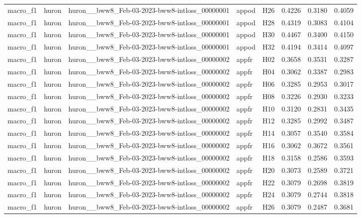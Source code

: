\begin{table}[tbp]
\begin{tabular}{lllllrrr}
macro\_f1 & huron & huron\_\_bww8\_Feb-03-2023-bww8-intloss\_00000001 & appod & H26 & 0.4226 & 0.3180 & 0.4059 \\
macro\_f1 & huron & huron\_\_bww8\_Feb-03-2023-bww8-intloss\_00000001 & appod & H28 & 0.4319 & 0.3083 & 0.4104 \\
macro\_f1 & huron & huron\_\_bww8\_Feb-03-2023-bww8-intloss\_00000001 & appod & H30 & 0.4467 & 0.3400 & 0.4150 \\
macro\_f1 & huron & huron\_\_bww8\_Feb-03-2023-bww8-intloss\_00000001 & appod & H32 & 0.4194 & 0.3414 & 0.4097 \\
macro\_f1 & huron & huron\_\_bww8\_Feb-03-2023-bww8-intloss\_00000002 & appfr & H02 & 0.3658 & 0.3531 & 0.3287 \\
macro\_f1 & huron & huron\_\_bww8\_Feb-03-2023-bww8-intloss\_00000002 & appfr & H04 & 0.3062 & 0.3387 & 0.2983 \\
macro\_f1 & huron & huron\_\_bww8\_Feb-03-2023-bww8-intloss\_00000002 & appfr & H06 & 0.3285 & 0.2953 & 0.3017 \\
macro\_f1 & huron & huron\_\_bww8\_Feb-03-2023-bww8-intloss\_00000002 & appfr & H08 & 0.3226 & 0.2930 & 0.3233 \\
macro\_f1 & huron & huron\_\_bww8\_Feb-03-2023-bww8-intloss\_00000002 & appfr & H10 & 0.3120 & 0.2831 & 0.3435 \\
macro\_f1 & huron & huron\_\_bww8\_Feb-03-2023-bww8-intloss\_00000002 & appfr & H12 & 0.3285 & 0.2992 & 0.3487 \\
macro\_f1 & huron & huron\_\_bww8\_Feb-03-2023-bww8-intloss\_00000002 & appfr & H14 & 0.3057 & 0.3540 & 0.3584 \\
macro\_f1 & huron & huron\_\_bww8\_Feb-03-2023-bww8-intloss\_00000002 & appfr & H16 & 0.3062 & 0.3672 & 0.3561 \\
macro\_f1 & huron & huron\_\_bww8\_Feb-03-2023-bww8-intloss\_00000002 & appfr & H18 & 0.3158 & 0.2586 & 0.3593 \\
macro\_f1 & huron & huron\_\_bww8\_Feb-03-2023-bww8-intloss\_00000002 & appfr & H20 & 0.3073 & 0.2589 & 0.3721 \\
macro\_f1 & huron & huron\_\_bww8\_Feb-03-2023-bww8-intloss\_00000002 & appfr & H22 & 0.3079 & 0.2698 & 0.3819 \\
macro\_f1 & huron & huron\_\_bww8\_Feb-03-2023-bww8-intloss\_00000002 & appfr & H24 & 0.3079 & 0.2744 & 0.3818 \\
macro\_f1 & huron & huron\_\_bww8\_Feb-03-2023-bww8-intloss\_00000002 & appfr & H26 & 0.3079 & 0.2487 & 0.3681 \\

\end{tabular}
\end{table}

